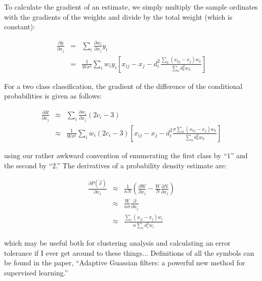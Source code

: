 \documentclass[12pt]{report}
\begin{document}
\begin{flushleft}
To calculate the gradient of an estimate, we simply multiply the sample ordinates
with the gradients of the weights and divide by the total weight (which is constant):

\begin{eqnarray}
  \frac{\partial \bar y}{\partial x_j} & = & \sum_i \frac{\partial w_i}{\partial x_j} y_i \\
  & = & \frac{1}{W \sigma^2} \sum_i w_i y_i \left [ x_{ij} - x_j
                - d_i^2 \frac{\sum_k (x_{kj} - x_j) w_k} {\sum_k d_k^2 w_k} \right ]
\end{eqnarray}

For a two class classification, the gradient of the difference of the conditional 
probabilities is given as follows:

\begin{eqnarray}
  \frac{\partial R}{\partial x_j} & \approx & \sum_i \frac{\partial w_i}{\partial x_j} (2c_i-3) \\
  & \approx & \frac{1}{W \sigma^2} \sum_i w_i (2c_i - 3) \left [ x_{ij} - x_j
                - d_i^2 \frac{\sigma \sum_k (x_{kj} - x_j) w_k} {\sum_k d_k^2 w_k} \right ]
\end{eqnarray}

using our rather awkward convention of enumerating the first class by ``$1$'' 
and the second by ``$2$.'' \linebreak
\linebreak
The derivatives of a probability density estimate are:

\begin{eqnarray}
  \frac{\partial P (\vec x)}{\partial x_j} & \approx & 
		\frac{1}{nN} \left (\frac{\partial W}{\partial x_j} - 
		\frac{W}{N} \frac{\partial N} {\partial x_j} \right ) \\
  & \approx & \frac {W}{n \sigma} \frac{\partial} {\partial x_j} \\
  & \approx & \frac{\sum_i (x_{ij} - x_j) w_i} {n \sum_i d_i^2 w_i}
\end{eqnarray}

which may be useful both for clustering analysis and
calculating an error tolerance if I ever get around to these things...\linebreak
\linebreak
Definitions of all the symbols can be found in the paper, ``Adaptive Guassian filters:
a powerful new method for supervised learning.''

\end{flushleft}
\end{document}
